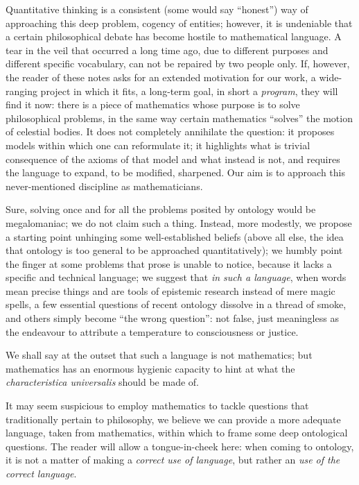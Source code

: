 Quantitative thinking is a consistent (some would say ``honest'') way of approaching this deep problem, cogency of entities; however, it is undeniable that a certain philosophical debate has become hostile to mathematical language. A tear in the veil that occurred a long time ago, due to different purposes and different specific vocabulary, can not be repaired by two people only. If, however, the reader of these notes asks for an extended motivation for our work, a wide-ranging project in which it fits, a long-term goal, in short a \emph{program}, they will find it now: there is a piece of mathematics whose purpose is to solve philosophical problems, in the same way certain mathematics ``solves'' the motion of celestial bodies. It does not completely annihilate the question: it proposes models within which one can reformulate it; it highlights what is trivial consequence of the axioms of that model and what instead is not, and requires the language to expand, to be modified, sharpened. Our aim is to approach this never-mentioned discipline as mathematicians. %

Sure, solving once and for all the problems posited by ontology would be megalomaniac; we do not claim such a thing. Instead, more modestly, we propose a starting point unhinging some well-established beliefs (above all else, the idea that ontology is too general to be approached quantitatively); we humbly point the finger at some problems that prose is unable to notice, because it lacks a specific and technical language; we suggest that \emph{in such a language}, when words mean precise things and are tools of epistemic research instead of mere magic spells, a few essential questions of recent ontology dissolve in a thread of smoke, and others simply become ``the wrong question'': not false, just meaningless as the endeavour to attribute a temperature to consciousness or justice.

We shall say at the outset that such a language is not mathematics; but mathematics has an enormous hygienic capacity to hint at what the \emph{characteristica universalis} should be made of.

It may seem suspicious to employ mathematics to tackle questions that traditionally pertain to philosophy, we believe we can provide a more adequate language, taken from mathematics, within which to frame some deep ontological questions. The reader will allow a tongue-in-cheek here: when coming to ontology, it is not a matter of making a \emph{correct use of language}, but rather an \emph{use of the correct language}. 

